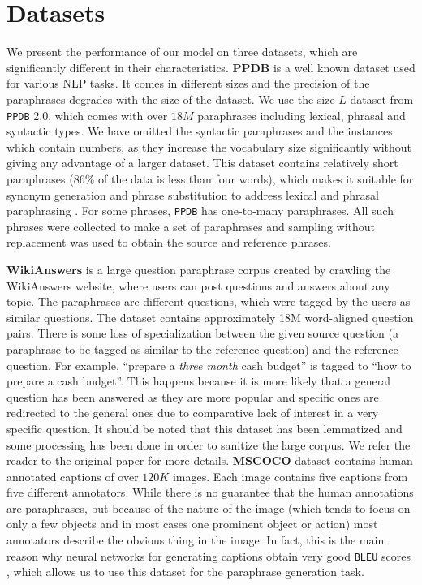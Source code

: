 \section{Datasets}
We present the performance of our model on three datasets, which are significantly different in their characteristics.
\textbf{PPDB} \cite{pavlick2015} is a well known dataset used for various NLP tasks. It comes in different sizes and the precision of the paraphrases degrades with the size of the dataset. We use the size $L$ dataset from \texttt{PPDB} 2.0, which comes with over $18M$ paraphrases including lexical, phrasal and syntactic types. We have omitted the syntactic paraphrases and the instances which contain numbers, as they increase the vocabulary size significantly without giving any advantage of a larger dataset. This dataset contains relatively short paraphrases ($86\%$ of the data is less than four words), which makes it suitable for synonym generation and phrase substitution to address lexical and phrasal paraphrasing \cite{Madnani2010}. For some phrases, \texttt{PPDB} has one-to-many paraphrases. All such phrases were collected to make a set of paraphrases and sampling without replacement was used to obtain the source and reference phrases.
 
\textbf{WikiAnswers} \cite{fader2013paraphrase} is a large question paraphrase corpus created by crawling the WikiAnswers website, where users can post questions and answers about any topic. The paraphrases are different questions, which were tagged by the users as similar questions. The dataset contains approximately 18M word-aligned question pairs. There is some loss of specialization between the given source question (a paraphrase to be tagged as similar to the reference question) and the reference question. For example, ``prepare a \emph{three month} cash budget'' is tagged to ``how to prepare a cash budget''. This happens because it is more likely that a general question has been answered as they are more popular and specific ones are redirected to the general ones due to comparative lack of interest in a very specific question. It should be noted that this dataset has been lemmatized and some processing has been done in order to sanitize the large corpus. We refer the reader to the original paper for more details.
\textbf{MSCOCO} \cite{lin2014microsoft} dataset contains human annotated captions of over $120K$ images. Each image contains five captions from five different annotators. While there is no guarantee that the human annotations are paraphrases, but because of the nature of the image (which tends to focus on only a few objects and in most cases one prominent object or action) most annotators describe the obvious thing in the image. In fact, this is the main reason why neural networks for generating captions obtain very good \texttt{BLEU} scores \cite{VinyalsTBE14}, which allows us to use this dataset for the paraphrase generation task.
 
